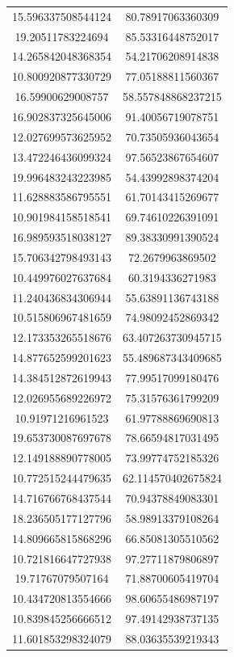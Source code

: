 \begin{table}
\begin{tabular}{cc}
15.596337508544124 & 80.78917063360309 \\
19.20511783224694 & 85.53316448752017 \\
14.265842048368354 & 54.21706208914838 \\
10.800920877330729 & 77.05188811560367 \\
16.59900629008757 & 58.557848868237215 \\
16.902837325645006 & 91.40056719078751 \\
12.027699573625952 & 70.73505936043654 \\
13.472246436099324 & 97.56523867654607 \\
19.996483243223985 & 54.43992898374204 \\
11.628883586795551 & 61.70143415269677 \\
10.901984158518541 & 69.74610226391091 \\
16.989593518038127 & 89.38330991390524 \\
15.706342798493143 & 72.2679963869502 \\
10.449976027637684 & 60.3194336271983 \\
11.240436834306944 & 55.63891136743188 \\
10.515806967481659 & 74.98092452869342 \\
12.173353265518676 & 63.407263730945715 \\
14.877652599201623 & 55.489687343409685 \\
14.384512872619943 & 77.99517099180476 \\
12.026955689226972 & 75.31576361799209 \\
10.91971216961523 & 61.97788869690813 \\
19.653730087697678 & 78.66594817031495 \\
12.149188890778005 & 73.99774752185326 \\
10.772515244479635 & 62.114570402675824 \\
14.716766768437544 & 70.94378849083301 \\
18.236505177127796 & 58.98913379108264 \\
14.809665815868296 & 66.85081305510562 \\
10.721816647727938 & 97.27711879806897 \\
19.71767079507164 & 71.88700605419704 \\
10.434720813554666 & 98.60655486987197 \\
10.839845256666512 & 97.49142938737135 \\
11.601853298324079 & 88.03635539219343 \\

\end{tabular}
\end{table}
